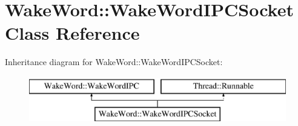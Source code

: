\hypertarget{classWakeWord_1_1WakeWordIPCSocket}{}\section{Wake\+Word\+:\+:Wake\+Word\+I\+P\+C\+Socket Class Reference}
\label{classWakeWord_1_1WakeWordIPCSocket}
Inheritance diagram for Wake\+Word\+:\+:Wake\+Word\+I\+P\+C\+Socket\+:\begin{figure}[H]
\begin{center}
\leavevmode
\includegraphics[height=2.000000cm]{d5/d6e/classWakeWord_1_1WakeWordIPCSocket}
\end{center}
\end{figure}
